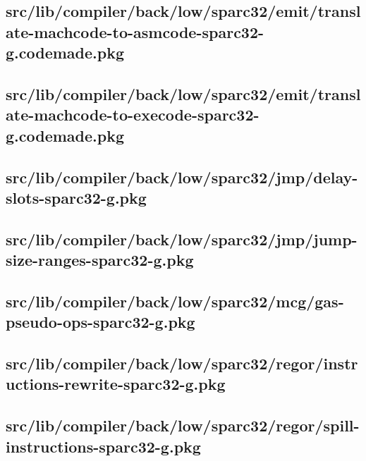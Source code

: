 \subsection{src/lib/compiler/back/low/sparc32/emit/translate-machcode-to-asmcode-sparc32-g.codemade.pkg}


\subsection{src/lib/compiler/back/low/sparc32/emit/translate-machcode-to-execode-sparc32-g.codemade.pkg}


\subsection{src/lib/compiler/back/low/sparc32/jmp/delay-slots-sparc32-g.pkg}


\subsection{src/lib/compiler/back/low/sparc32/jmp/jump-size-ranges-sparc32-g.pkg}


\subsection{src/lib/compiler/back/low/sparc32/mcg/gas-pseudo-ops-sparc32-g.pkg}


\subsection{src/lib/compiler/back/low/sparc32/regor/instructions-rewrite-sparc32-g.pkg}


\subsection{src/lib/compiler/back/low/sparc32/regor/spill-instructions-sparc32-g.pkg}


